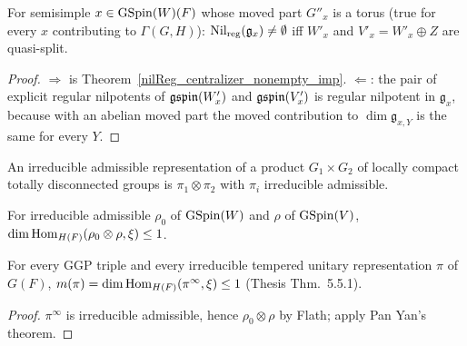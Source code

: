 \begin{theorem}
\label{nilReg_centralizer_nonempty_iff}
\leanok
{}
For semisimple $x\in\mathrm{GSpin}(W)(F)$ whose moved part $G''_x$ is a torus (true for every $x$ contributing
to $\Gamma(G,H)$): $\mathrm{Nil}_{\mathrm{reg}}(\mathfrak g_x)\neq\emptyset$ iff $W'_x$ and $V'_x=W'_x\oplus Z$ are
quasi-split.
\end{theorem}
\begin{proof}
\leanok
{}
$\Rightarrow$ is Theorem~\ref{nilReg_centralizer_nonempty_imp}. $\Leftarrow$: the pair of explicit regular nilpotents of $\mathfrak{gspin}(W'_x)$ and
$\mathfrak{gspin}(V'_x)$ is regular nilpotent in $\mathfrak g_x$, because with an abelian moved part the moved contribution to
$\dim\mathfrak g_{x,Y}$ is the same for every $Y$.
\end{proof}

\begin{literature}
\label{LIT-flath_tensor_decomposition}
\leanok
An irreducible admissible representation of a product $G_1\times G_2$ of locally compact totally
disconnected groups is $\pi_1\otimes\pi_2$ with $\pi_i$ irreducible admissible.

\end{literature}

\begin{literature}
\label{LIT-panYan_mult_le_one}
\leanok
{}
For irreducible admissible $\rho_0$ of $\mathrm{GSpin}(W)$ and $\rho$ of $\mathrm{GSpin}(V)$,
$\dim\mathrm{Hom}_{H(F)}(\rho_0\otimes\rho,\xi)\le 1$.

\end{literature}

\begin{theorem}
\label{emoryTakeda_mult_le_one}
\leanok
{}
For every GGP triple and every irreducible tempered unitary representation $\pi$ of $G(F)$,
$m(\pi)=\dim\mathrm{Hom}_{H(F)}(\pi^\infty,\xi)\le 1$ (Thesis Thm.~5.5.1).
\end{theorem}
\begin{proof}
\leanok
$\pi^\infty$ is irreducible admissible, hence $\rho_0\otimes\rho$ by Flath; apply Pan Yan's theorem.
\end{proof}

